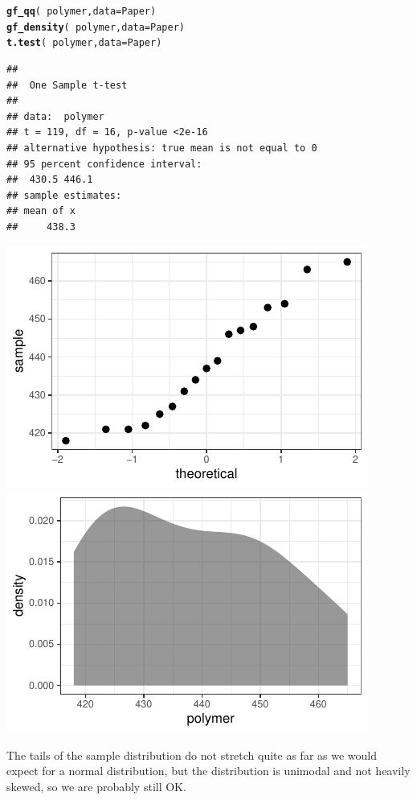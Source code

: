 \documentclass[twoside]{book}\usepackage[]{graphicx}\usepackage[]{xcolor}
\makeatletter
\def\maxwidth{ %
  \ifdim\Gin@nat@width>\linewidth
    \linewidth
  \else
    \Gin@nat@width
  \fi
}
\newcommand{\hlopt}[1]{\textcolor[rgb]{0,0,0}{#1}}%
\newcommand{\hlstd}[1]{\textcolor[rgb]{0.345,0.345,0.345}{#1}}%
\newcommand{\hlkwc}[1]{\textcolor[rgb]{0.333,0.667,0.333}{#1}}%
\newcommand{\hlkwd}[1]{\textcolor[rgb]{0.737,0.353,0.396}{\textbf{#1}}}%
\newenvironment{kframe}{%
 \def\at@end@of@kframe{}%
 \ifinner\ifhmode%
  \def\at@end@of@kframe{\end{minipage}}%
  \begin{minipage}{\columnwidth}%
 \fi\fi%
 \def\FrameCommand##1{\hskip\@totalleftmargin \hskip-\fboxsep
 \colorbox{shadecolor}{##1}\hskip-\fboxsep
     \hskip-\linewidth \hskip-\@totalleftmargin \hskip\columnwidth}%
 \MakeFramed {\advance\hsize-\width
   \@totalleftmargin\z@ \linewidth\hsize
   \@setminipage}}%
 {\par\unskip\endMakeFramed%
 \at@end@of@kframe}
\newenvironment{knitrout}{}{} %
\makeatother
\begin{document}
\begin{solution}
\begin{knitrout}
\color{fgcolor}\begin{kframe}
\begin{alltt}
\hlkwd{gf_qq}\hlstd{(} \hlopt{~} \hlstd{polymer,} \hlkwc{data} \hlstd{= Paper)}
\hlkwd{gf_density}\hlstd{(} \hlopt{~} \hlstd{polymer,} \hlkwc{data} \hlstd{= Paper)}
\hlkwd{t.test}\hlstd{(} \hlopt{~} \hlstd{polymer,} \hlkwc{data} \hlstd{= Paper)}
\end{alltt}
\begin{verbatim}
## 
## 	One Sample t-test
## 
## data:  polymer
## t = 119, df = 16, p-value <2e-16
## alternative hypothesis: true mean is not equal to 0
## 95 percent confidence interval:
##  430.5 446.1
## sample estimates:
## mean of x 
##     438.3
\end{verbatim}
\end{kframe}

{\centering \includegraphics[width=\maxwidth]{figures/fig-unnamed-chunk-162-1} 
\includegraphics[width=\maxwidth]{figures/fig-unnamed-chunk-162-2} 

}



\end{knitrout}
The tails of the sample distribution do not stretch quite as far as we would expect 
for a normal distribution, but the distribution is unimodal and not heavily skewed,
so we are probably still OK.
\end{solution}
\end{document}
